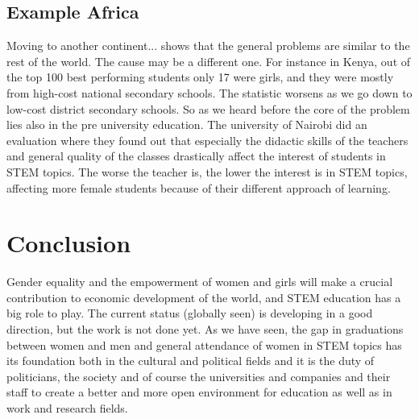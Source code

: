 	\subsection{Example Africa}
	Moving to another continent... shows that the general problems are similar to the rest of the world. The cause may be a different one.
	For instance in Kenya, out of the top 100 best performing students only 17 were girls, and they were mostly from high-cost national secondary schools. 
	The statistic worsens as we go down to low-cost district secondary schools.
	So as we heard before the core of the problem lies also in the pre university education.
	The university of Nairobi did an evaluation where they found out that especially the didactic skills of the teachers and general quality of the classes drastically affect the interest of students in STEM topics. The worse the teacher is, the lower the interest is in STEM topics, affecting more female students because of their different approach of learning.
	 \cite{tafrica1} \cite{tchina1} \cite{tusa1} \cite{tgender}
	
	\section{Conclusion}
	Gender equality and the empowerment of women and girls will make a crucial contribution to economic development of the world, and STEM education has a big role to play. The current status (globally seen) is  developing in a good direction, but the work is not done yet. As we have seen, the gap in graduations between women and men and general attendance of women in STEM topics has its foundation both in the cultural and political fields and it is the duty of politicians, the society and of course the universities and companies and their staff to create a better and more open environment for education as well as in work and research fields.